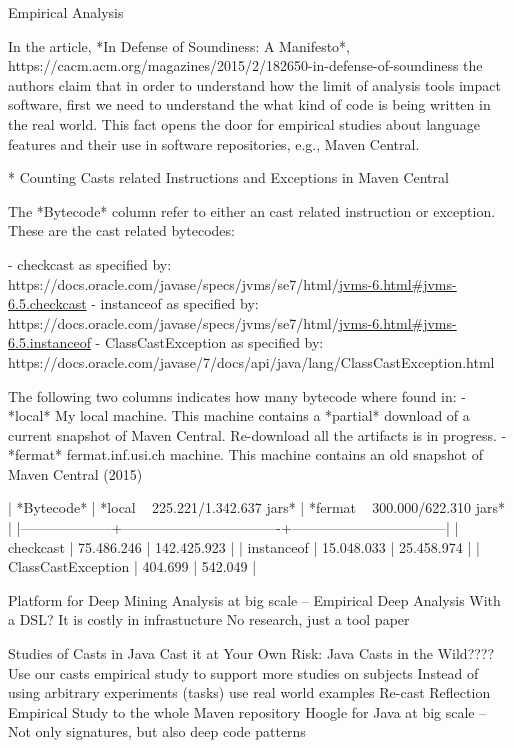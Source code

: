 Empirical Analysis


In the article, *In Defense of Soundiness: A Manifesto*,
https://cacm.acm.org/magazines/2015/2/182650-in-defense-of-soundiness
the authors claim that in order to understand how the limit of analysis tools impact software,
first we need to understand the what kind of code is being written in the real world.
This fact opens the door for empirical studies about language features and their use in
software repositories, e.g., Maven Central.


* Counting Casts related Instructions and Exceptions in Maven Central

The *Bytecode* column refer to either an cast related instruction or exception.
These are the cast related bytecodes:

- checkcast as specified by:
https://docs.oracle.com/javase/specs/jvms/se7/html/\url{jvms-6.html#jvms-6.5.checkcast}
- instanceof as specified by:
https://docs.oracle.com/javase/specs/jvms/se7/html/\url{jvms-6.html#jvms-6.5.instanceof}
- ClassCastException as specified by:
https://docs.oracle.com/javase/7/docs/api/java/lang/ClassCastException.html

The following two columns indicates how many bytecode where found in:
- *local*
My local machine.
This machine contains a *partial* download of a current snapshot of Maven Central.
Re-download all the artifacts is in progress.
- *fermat*
fermat.inf.usi.ch machine.
This machine contains an old snapshot of Maven Central (2015) 
 
| *Bytecode*         | *local ~ 225.221/1.342.637 jars* | *fermat ~ 300.000/622.310 jars* |
|--------------------+----------------------------------+---------------------------------|
| checkcast          |                       75.486.246 |                     142.425.923 |
| instanceof         |                       15.048.033 |                      25.458.974 |
| ClassCastException |                          404.699 |                         542.049 |

Platform for Deep Mining Analysis at big scale -- Empirical Deep Analysis
With a DSL?
It is costly in infrastucture
No research, just a tool paper

Studies of Casts in Java
Cast it at Your Own Risk: Java Casts in the Wild????
Use our casts empirical study to support more studies on subjects
Instead of using arbitrary experiments (tasks) use real world examples
Re-cast Reflection Empirical Study to the whole Maven repository
Hoogle for Java at big scale -- Not only signatures, but also deep code patterns

